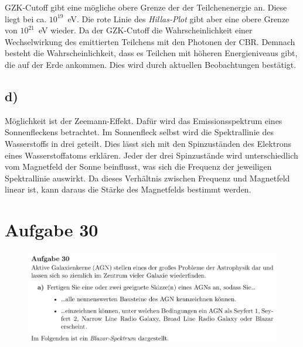     \justifying GZK-Cutoff gibt eine mögliche obere Grenze der der Teilchenenergie an. Diese liegt bei ca. $10^{19}$\SI{}{\electronvolt}. Die rote Linie des
    \textit{Hillas-Plot} gibt aber eine obere Grenze von $10^{21}$\SI{}{\electronvolt} wieder. Da der GZK-Cutoff die Wahrscheinlichkeit einer Wechselwirkung des emittierten 
    Teilchens mit den Photonen der CBR. Demnach besteht die Wahrscheinlichkeit, dass es Teilchen mit höheren Energieniveaus gibt, die auf der Erde ankommen. Dies wird durch 
    aktuellen Beobachtungen bestätigt.

\subsection{d)}

    \justifying Möglichkeit ist der Zeemann-Effekt. Dafür wird das Emissionsspektrum eines Sonnenfleckens betrachtet. Im Sonnenfleck selbst wird die Spektrallinie des
    Wasserstoffs in drei geteilt. Dies lässt sich mit den Spinzuständen des Elektrons eines Wasserstoffatoms erklären. Jeder der drei Spinzustände wird unterschiedlich vom Magnetfeld der
    Sonne beinflusst, was sich die Frequenz der jeweiligen Spektrallinie auswirkt. Da dieses Verhältnis zwischen Frequenz und Magnetfeld linear ist, kann daraus die Stärke des Magnetfelds
    bestimmt werden. 

\section{Aufgabe 30}

\begin{figure}[H]
    \centering
    \includegraphics[width=\textwidth]{images/Aufgabe30a.jpg}
\end{figure}

